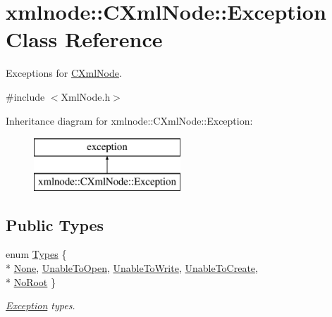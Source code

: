 \hypertarget{classxmlnode_1_1_c_xml_node_1_1_exception}{\section{xmlnode\+:\+:C\+Xml\+Node\+:\+:Exception Class Reference}
\label{classxmlnode_1_1_c_xml_node_1_1_exception}
}


Exceptions for \hyperlink{classxmlnode_1_1_c_xml_node}{C\+Xml\+Node}.  




{\ttfamily \#include $<$Xml\+Node.\+h$>$}

Inheritance diagram for xmlnode\+:\+:C\+Xml\+Node\+:\+:Exception\+:\begin{figure}[H]
\begin{center}
\leavevmode
\includegraphics[height=2.000000cm]{classxmlnode_1_1_c_xml_node_1_1_exception}
\end{center}
\end{figure}
\subsection*{Public Types}
\begin{DoxyCompactItemize}
\item 
enum \hyperlink{classxmlnode_1_1_c_xml_node_1_1_exception_abdbe07531ef4b19192f1fa2f819ed75f}{Types} \{ \\*
\hyperlink{classxmlnode_1_1_c_xml_node_1_1_exception_abdbe07531ef4b19192f1fa2f819ed75fa22036006e7862ed7f6fc42091f6a3bc8}{None}, 
\hyperlink{classxmlnode_1_1_c_xml_node_1_1_exception_abdbe07531ef4b19192f1fa2f819ed75fa725fdfe67e4fbd5539133a341a5e0a6e}{Unable\+To\+Open}, 
\hyperlink{classxmlnode_1_1_c_xml_node_1_1_exception_abdbe07531ef4b19192f1fa2f819ed75fab4da3fb6cf56910a8302ddb34b697295}{Unable\+To\+Write}, 
\hyperlink{classxmlnode_1_1_c_xml_node_1_1_exception_abdbe07531ef4b19192f1fa2f819ed75fa34828bed7772bc0588f97192c03ea4ad}{Unable\+To\+Create}, 
\\*
\hyperlink{classxmlnode_1_1_c_xml_node_1_1_exception_abdbe07531ef4b19192f1fa2f819ed75fa5e03a8ddc6c8873e07c6a34dc1d7a0e0}{No\+Root}
 \}
\begin{DoxyCompactList}\small\item\em \hyperlink{classxmlnode_1_1_c_xml_node_1_1_exception}{Exception} types. \end{DoxyCompactList}\end{DoxyCompactItemize}
